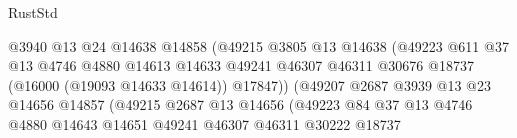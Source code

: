 \begin{lexlean}{RustStd}
\begin{coremodule}
                                            @3940
                                            @13
                                            @24
                                            @14638
                                            @14858
                                            (@49215
                                              @3805
                                              @13
                                              @14638
                                              (@49223
                                                @611
                                                @37
                                                @13
                                                @4746
                                                @4880
                                                @14613
                                                @14633
                                                @49241
                                                @46307
                                                @46311
                                                @30676
                                                @18737
                                                (@16000 (@19093 @14633 @14614))
                                                @17847))
                                            (@49207
                                              @2687
                                              @3939
                                              @13
                                              @23
                                              @14656
                                              @14857
                                              (@49215
                                                @2687
                                                @13
                                                @14656
                                                (@49223
                                                  @84
                                                  @37
                                                  @13
                                                  @4746
                                                  @4880
                                                  @14643
                                                  @14651
                                                  @49241
                                                  @46307
                                                  @46311
                                                  @30222
                                                  @18737

\end{coremodule}
\end{lexlean}
